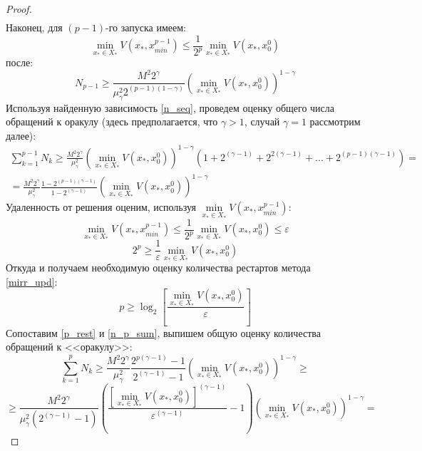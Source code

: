 \begin{proof}
$$\begin{aligned}
       \end{aligned}
       $$
       Наконец, для $(p-1)$-го запуска имеем:
       \begin{equation} \label{v_seq}
           \min\limits_{x_* \in X_*}{V(x_*, x_{min}^{p - 1})} \leq \frac{1}{2^p} \min\limits_{x_* \in X_*}{V(x_*, x_0^0)}
       \end{equation}
       после:
       \begin{equation} \label{n_seq}
           N_{p-1} \geq \frac{M^2 2^{\gamma}}{\mu_{\gamma}^2 2^{(p - 1)(1 - \gamma)}} \left(\min\limits_{x_* \in X_*}{V(x_*, x_0^0)}\right)^{1 - \gamma}
       \end{equation}
       Используя найденную зависимость \eqref{n_seq}, проведем оценку общего числа обращений к оракулу (здесь предполагается, что $\gamma > 1$, случай $\gamma = 1$ рассмотрим далее):
       \begin{equation} \label{n_p_sum}
       \begin{aligned}
           \sum_{k=1}^{p - 1} N_k \geq \frac{M^2 2^{\gamma}}{\mu_{\gamma}^2} \left(\min\limits_{x_* \in X_*}{V(x_*, x_0^0)}\right)^{1 - \gamma} (1 + 2^{(\gamma-1)} + 2^{2(\gamma - 1)} + ... + 2^{(p-1)(\gamma - 1)}) = \\
           = \frac{M^2 2^{\gamma}}{\mu_{\gamma}^2} \frac{1 - 2^{(p-1)(\gamma-1)}}{1 - 2^{(\gamma-1)}} \left(\min\limits_{x_* \in X_*}{V(x_*, x_0^0)}\right)^{1 - \gamma}
       \end{aligned}
       \end{equation}
       Удаленность от решения оценим, используя $\min\limits_{x_* \in X_*}{V(x_*, x_{min}^{p - 1})}$:
       $$
           \min\limits_{x_* \in X_*}{V(x_*, x_{min}^{p - 1})} \leq \frac{1}{2^p} \min\limits_{x_* \in X_*}{V(x_*, x_0^0)} \leq \varepsilon
       $$
       $$
            2^p \geq \frac{1}{\varepsilon} \min\limits_{x_* \in X_*}{V(x_*, x_0^0)}
       $$
       Откуда и получаем необходимую оценку количества рестартов метода \eqref{mirr_upd}:
       \begin{equation} \label{p_rest}
            p \geq \log_2{\left[\frac{\min\limits_{x_* \in X_*}{V(x_*, x_0^0)}}{\varepsilon}\right]}
       \end{equation}
       Сопоставим \eqref{p_rest} и \eqref{n_p_sum}, выпишем общую оценку количества обращений к <<оракулу>>:
       $$
           \sum_{k=1}^{p} N_k \geq \frac{M^2 2^{\gamma}}{\mu_{\gamma}^2} \frac{2^{p(\gamma-1)} - 1}{2^{(\gamma-1)} - 1} \left(\min\limits_{x_* \in X_*}{V(x_*, x_0^0)}\right)^{1 - \gamma} \geq 
       $$
       $$
           \geq \frac{M^2 2^{\gamma}}{\mu_{\gamma}^2 (2^{(\gamma-1)} - 1)} \left(\frac{\left[\min\limits_{x_* \in X_*}{V(x_*, x_0^0)}\right]^{(\gamma-1)}}{\varepsilon^{(\gamma-1)}} - 1\right) \left(\min\limits_{x_* \in X_*}{V(x_*, x_0^0)}\right)^{1 - \gamma} =
$$
\end{proof}
